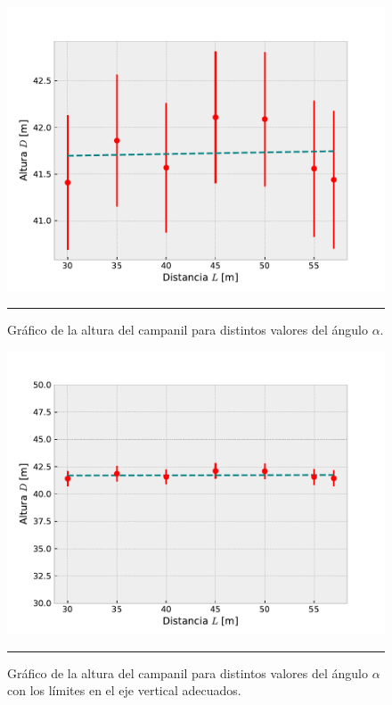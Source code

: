 \documentclass[10pt,a4paper]{article}
\begin{document}
\begin{multicols}{2}
	\begin{figure}[H]
		\centering
		\includegraphics[scale= 0.5]{IMG/Altura_dist.pdf} 
		\caption{Gráfico de la altura del campanil para distintos valores del ángulo $\alpha$.}
		\label{Grafico campanil}
		\rule{80mm}{0.1mm}
	\end{figure}

	\begin{figure}[H]
		\centering
		\includegraphics[scale=0.5]{IMG/Altura_dist_2.pdf}
		\caption{Gráfico de la altura del campanil para distintos valores del ángulo $\alpha$ con los límites en el eje vertical adecuados.}
		\label{Grafico campanil ajustado}
		\rule{80mm}{0.1mm}
	\end{figure}
	

\end{multicols}
\end{document}
